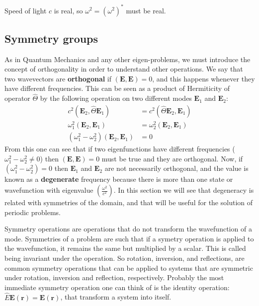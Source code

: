 Speed of light $c$ is real, so $\omega^2 = \left(\omega^2\right)^*$ must be real.

\subsection{Symmetry groups}

As in Quantum Mechanics and any other eigen-problems, we must introduce the concept of orthogonality in order to understand other operations.
We say that two wavevectors are \textbf{orthogonal} if $\left(\mathbf{E},\mathbf{E}\right) = 0$, and this happens whenever they have different frequencies. This can be seen as a product of Hermiticity of operator $\hat{\Theta}$ by the following operation on two different modes $\mathbf{E}_1$ and $\mathbf{E}_2$:
\begin{align*}
c^2\left(\mathbf{E}_2,\hat{\Theta}\mathbf{E}_1\right) &=
c^2\left(\hat{\Theta}\mathbf{E}_2,\mathbf{E}_1\right) \\
\omega_1^2\left(\mathbf{E}_2,\mathbf{E}_1\right) &= \omega_2^2\left(\mathbf{E}_2,\mathbf{E}_1\right) \\
\left(\omega_1^2-\omega_2^2\right) \left(\mathbf{E}_2,\mathbf{E}_1\right) &= 0
\end{align*}
From this one can see that if two eigenfunctions have different frequencies ($\omega_1^2-\omega_2^2\neq 0$) then $\left(\mathbf{E},\mathbf{E}\right) = 0$
must be true and they are orthogonal.
Now, if $\left(\omega_1^2-\omega_2^2\right) = 0$ then $\mathbf{E}_1$ and $\mathbf{E}_2$ are not necessarily orthogonal, and the value is known as a \textbf{degenerate} frequency because there is more than one state or wavefunction with eigenvalue $\left(\frac{\omega^2}{c^2}\right)$. In this section we will see that degeneracy is related with symmetries of the domain, and that will be useful for the solution of periodic problems.  

Symmetry operations are operations that do not transform the wavefunction of a mode. Symmetries of a problem are such that if a symetry operation is applied to the wavefunction, it remains the same but multiplied by a scalar. This is called being invariant under the operation.
So rotation, inversion, and reflections, are common symmetry operations that can be applied to systems that are symmetric under rotation, inversion and reflection, respectively. 
Probably the most immediate symmetry operation one can think of is the identity operation:
$\hat{E}\mathbf{E(r)} = \mathbf{E(r)}$, that transform a system into itself.

